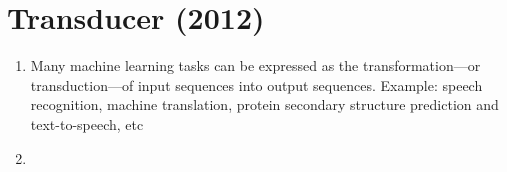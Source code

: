 \chapter{Transducer (2012)}

\begin{enumerate}
    \item Many machine learning tasks can be expressed as the transformation—or transduction—of input sequences into output sequences. 
    Example: speech recognition, machine translation, protein secondary structure prediction and text-to-speech, etc
    \hfill \cite{arxiv/1211.3711/Sequence-Transduction-RNN}

    \item 
\end{enumerate}














